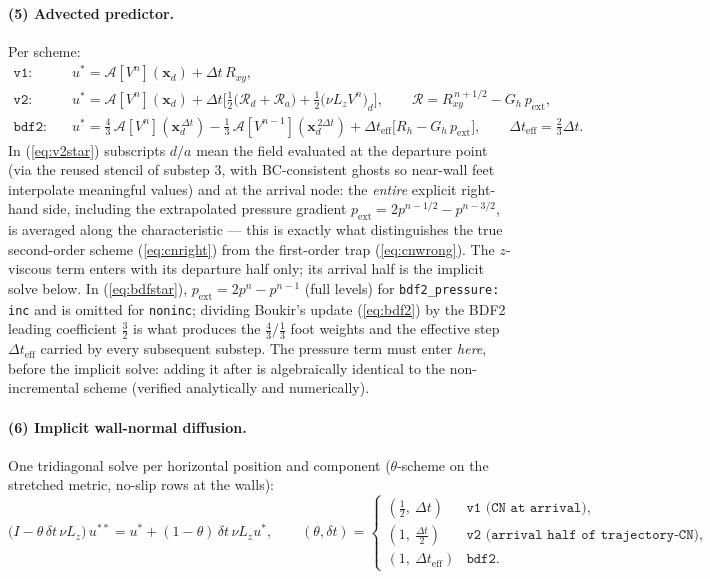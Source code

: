 \documentclass[11pt,a4paper]{article}
\newcommand{\bx}{\mathbf{x}}
\begin{document}
\paragraph{(5) Advected predictor.} Per scheme:
\begin{align}
\texttt{v1:}\quad & u^{*} = \mathcal A[V^{n}](\bx_d) + \Delta t\,R_{xy},
\label{eq:v1star}\\[4pt]
\texttt{v2:}\quad & u^{*} = \mathcal A[V^{n}](\bx_d)
+ \Delta t\Big[\tfrac12\big(\mathcal R_d + \mathcal R_a\big)
+ \tfrac12 \big(\nu L_z V^{n}\big)_d\Big],
\qquad
\mathcal R = R_{xy}^{\,n+1/2} - G_h\, p_{\mathrm{ext}},
\label{eq:v2star}\\[4pt]
\texttt{bdf2:}\quad & u^{*} =
\tfrac43\,\mathcal A[V^{n}](\bx_d^{\,\Delta t})
- \tfrac13\,\mathcal A[V^{n-1}](\bx_d^{\,2\Delta t})
+ \Delta t_{\mathrm{eff}}\big[R_h - G_h\,p_{\mathrm{ext}}\big],
\qquad
\Delta t_{\mathrm{eff}}=\tfrac{2}{3}\Delta t.
\label{eq:bdfstar}
\end{align}
In (\ref{eq:v2star}) subscripts $d/a$ mean the field evaluated at the
departure point (via the reused stencil of substep 3, with BC-consistent
ghosts so near-wall feet interpolate meaningful values) and at the arrival
node: the \emph{entire} explicit right-hand side, including the extrapolated
pressure gradient $p_{\mathrm{ext}}=2p^{n-1/2}-p^{n-3/2}$, is averaged along
the characteristic --- this is exactly what distinguishes the true
second-order scheme (\ref{eq:cnright}) from the first-order trap
(\ref{eq:cnwrong}). The $z$-viscous term enters with its departure half only;
its arrival half is the implicit solve below. In (\ref{eq:bdfstar}),
$p_{\mathrm{ext}}=2p^{n}-p^{n-1}$ (full levels) for
\texttt{bdf2\_pressure: inc} and is omitted for \texttt{noninc}; dividing
Boukir's update (\ref{eq:bdf2}) by the BDF2 leading coefficient $\tfrac32$ is
what produces the $\tfrac43/\tfrac13$ foot weights and the effective step
$\Delta t_{\mathrm{eff}}$ carried by every subsequent substep. The pressure
term must enter \emph{here}, before the implicit solve: adding it after is
algebraically identical to the non-incremental scheme (verified analytically
and numerically).

\paragraph{(6) Implicit wall-normal diffusion.} One tridiagonal solve per
horizontal position and component ($\theta$-scheme on the stretched metric,
no-slip rows at the walls):
\begin{equation}
\big(I - \theta\,\delta t\,\nu L_z\big)\,u^{**}
= u^{*} + (1-\theta)\,\delta t\,\nu L_z u^{*},
\qquad
(\theta,\delta t)=
\begin{cases}
(\tfrac12,\ \Delta t) & \texttt{v1 (CN at arrival)},\\
(1,\ \tfrac{\Delta t}{2}) & \texttt{v2 (arrival half of trajectory-CN)},\\
(1,\ \Delta t_{\mathrm{eff}}) & \texttt{bdf2}.
\end{cases}
\label{eq:zsolve}
\end{equation}
\end{document}
